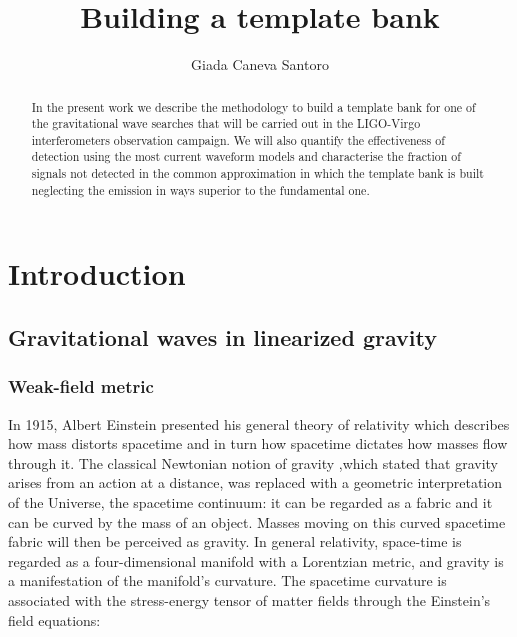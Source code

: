 \documentclass[binding=0.6cm, LaM]{sapthesis}
\title{Building a template bank}
\author{Giada Caneva Santoro}
\begin{document}
\frontmatter
\maketitle
\dedication{Fortsett å gå.}

\begin{abstract}
In the present work we describe the methodology to build a template bank for one of the gravitational wave searches that will be carried out in the LIGO-Virgo interferometers observation campaign. 
We will also quantify the effectiveness of detection using the most current waveform models and characterise the fraction of signals not detected in the common approximation in which the template 
bank is built neglecting the emission in ways superior to the fundamental one.
\end{abstract}

\tableofcontents

\mainmatter 




\chapter{Introduction}

\section{Gravitational waves in linearized gravity}

\subsection{Weak-field metric}


In 1915, Albert Einstein presented his general theory of relativity  which describes how mass distorts spacetime and in turn how spacetime dictates how masses flow through it. 
The classical Newtonian notion of gravity ,which stated that gravity arises from an action at a distance, was replaced with a geometric interpretation of the Universe, the spacetime continuum: it 
can be regarded as a fabric and it can be curved by the mass of an object. Masses moving on this curved spacetime fabric will then be perceived as gravity. 
In general relativity, space-time is regarded as a four-dimensional manifold with a Lorentzian metric, and gravity is a manifestation of the manifold’s curvature.
 The spacetime curvature is associated with the stress-energy tensor of matter fields through the Einstein’s field equations:
\end{document}
